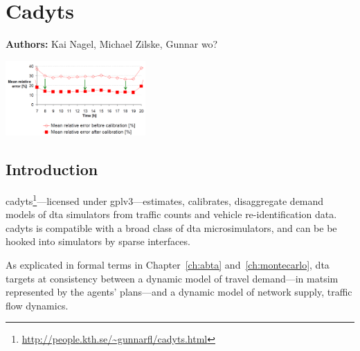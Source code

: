 \chapter{Cadyts}
\label{ch:cadyts}

\hfill \textbf{Authors:} Kai Nagel, Michael Zilske, Gunnar wo?

\begin{center} \includegraphics[width=0.4\textwidth, angle=0]{extending/figures/cadyts/cadyts} \end{center}




\section{Introduction}
\gls{cadyts}\footnote{\url{http://people.kth.se/~gunnarfl/cadyts.html}}---licensed under \gls{gplv3}---estimates, \ie calibrates, disaggregate demand models of \gls{dta} simulators from traffic counts and vehicle re-identification data. \gls{cadyts} is compatible with a broad class of \gls{dta} microsimulators, and can be be hooked into simulators by sparse interfaces.

As explicated in formal terms in Chapter~\ref{ch:abta} and~\ref{ch:montecarlo}, \gls{dta} targets at consistency between a dynamic model of travel demand---in \gls{matsim} represented by the agents' plans---and a dynamic model of network supply, \ie traffic flow dynamics. 


